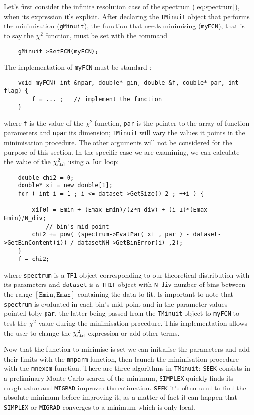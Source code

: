 	Let's first consider the infinite resolution case of the spectrum (\ref{eq:spectrum}), when its expression it's explicit. After declaring the \texttt{TMinuit} object that performs the minimisation (\texttt{gMinuit}), the function that needs minimising (\texttt{myFCN}), that is to say the $\chi^2$ function, must be set with the command
	\begin{lstlisting}
	gMinuit->SetFCN(myFCN);
	\end{lstlisting}
	The implementation of \texttt{myFCN} must be standard \cite{root}:
	\begin{lstlisting}
	void myFCN( int &npar, double* gin, double &f, double* par, int flag) {
		f = ... ;	// implement the function
	}
	\end{lstlisting}
	where \texttt{f} is the value of the $\chi^2$ function, \texttt{par} is the pointer to the array of function parameters and \texttt{npar} its dimension; \texttt{TMinuit} will vary the values it points in the minimisation procedure. The other arguments will not be considered for the purpose of this section. In the specific case we are examining, we can calculate the value of the $\chi^2_\textup{std}$ using a \texttt{for} loop:
	\begin{lstlisting}
	double chi2 = 0;
	double* xi = new double[1];
	for ( int i = 1 ; i <= dataset->GetSize()-2 ; ++i ) {
	
		xi[0] = Emin + (Emax-Emin)/(2*N_div) + (i-1)*(Emax-Emin)/N_div;	
			// bin's mid point
		chi2 += pow( (spectrum->EvalPar( xi , par ) - dataset->GetBinContent(i)) / datasetNH->GetBinError(i) ,2);
	}
	f = chi2;
	\end{lstlisting}
	where \texttt{spectrum} is a \texttt{TF1} object corresponding to our theoretical distribution with its parameters and \texttt{dataset} is a \texttt{TH1F} object with \texttt{N\_div} number of bins between the range $[\texttt{Emin},\texttt{Emax}]$ containing the data to fit. Is important to note that \texttt{spectrum} is evaluated in each bin's mid point and in the parameter values pointed toby \texttt{par}, the latter being passed from the \texttt{TMinuit} object to \texttt{myFCN} to test the $\chi^2$ value during the minimisation procedure. This implementation allows the user to change the $\chi^2_\textup{std}$ expression or add other terms. 
	
	Now that the function to minimise is set we can initialise the parameters and add their limits with the \texttt{mnparm} function, then launch the minimisation procedure with the \texttt{mnexcm} function. There are three algorithms in \texttt{TMinuit}: \texttt{SEEK} consists in a preliminary Monte Carlo search of the minimum, \texttt{SIMPLEX} quickly finds its rough value and \texttt{MIGRAD} improves the estimation. \texttt{SEEK} it's often used to find the absolute minimum before improving it, as a matter of fact it can happen that \texttt{SIMPLEX} or \texttt{MIGRAD} converges to a minimum which is only local.
	
